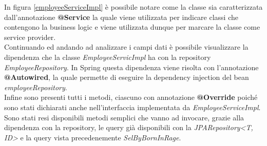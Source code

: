 \FloatBarrier
In figura \ref{employeeServiceImpl} è possibile notare come la classe sia caratterizzata dall'annotazione \textbf{@Service} la quale viene utilizzata per indicare classi che contengono la business logic e viene utilizzata dunque per marcare la classe come service provider.\\
Continuando ed andando ad analizzare i campi dati è possibile visualizzare la dipendenza che la classe \textit{EmployeeServicImpl} ha con la repository \textit{EmployeeRepository}. In Spring questa dipendenza viene risolta con l'annotazione \textbf{@Autowired}, la quale permette di eseguire la dependency injection del bean \textit{employeeRepository}.\\
Infine sono presenti tutti i metodi, ciascuno con annotazione \textbf{@Override} poiché sono stati dichiarati anche nell'interfaccia implementata da \textit{EmployeeServiceImpl}. Sono stati resi disponibili metodi semplici che vanno ad invocare, grazie alla dipendenza con la repository, le query già disponibili con la \textit{JPARepository<T, ID>} e la query vista precedenemente \textit{SelByBornInRage}.
